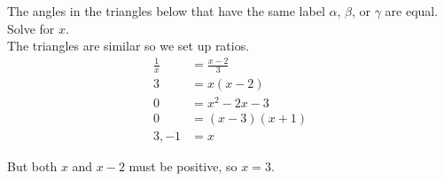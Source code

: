 The angles in the triangles below that have the same label $\alpha$, $\beta$, or $\gamma$ are equal. Solve for $x$.
\[\]
The triangles are similar so we set up ratios.
$$
\begin{align*}
  \frac{1}{x} &= \frac{x-2}{3} \\
  3 &= x(x-2) \\
  0 &= x^2 - 2x - 3 \\
  0 &= (x - 3)(x + 1) \\
  3, -1 &= x
\end{align*}
$$

But both $x$ and $x - 2$ must be positive, so $x = 3$.
